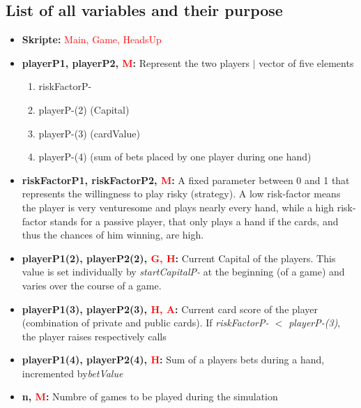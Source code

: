 \documentclass[11pt]{article}
\begin{document}
\subsection{List of all variables and their purpose}
\begin{itemize}

\item	\textbf{Skripte:} \textcolor{red}{Main, Game, HeadsUp} \\

\item	\textbf{playerP1, playerP2, \textcolor{red}{M}:} 
Represent the two players $|$ vector of five elements
\begin{enumerate}
	\item riskFactorP-
	\item playerP-(2) (Capital)
	\item playerP-(3) (cardValue)
	\item playerP-(4) (sum of bets placed by one player during one hand)
\end{enumerate}		
	
\item	\textbf{riskFactorP1, riskFactorP2, \textcolor{red}{M}:}  A fixed parameter between 0 and 1 that represents the willingness to play risky (strategy). A low risk-factor means the player is very venturesome and plays nearly every hand, while a high risk-factor stands for a passive player, that only plays a hand if the cards, and thus the chances of him winning, are high.\\


\item	\textbf{playerP1(2), playerP2(2), \textcolor{red}{G, H}:} Current Capital of the players. This value is set individually by \emph{startCapitalP-} at the beginning (of a game) and varies over the course of a game.\\

\item	\textbf{playerP1(3), playerP2(3), \textcolor{red}{H, A}:} Current card score of the player (combination of private and public cards). If  \emph{riskFactorP- $<$ playerP-(3)}, the player raises respectively calls\\

\item	\textbf{playerP1(4), playerP2(4), \textcolor{red}{H}:} 
Sum of a players bets during a hand, incremented by\emph{betValue}\\
\item	\textbf{n, \textcolor{red}{M}:} Numbre of games to be played during the simulation\\


\end{itemize}
\end{document}
